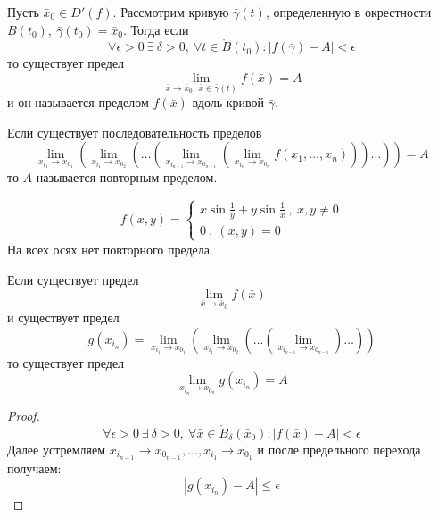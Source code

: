\begin{definition}
    Пусть $\bar{x}_0\in D'(f)$. Рассмотрим кривую $\bar{\gamma}(t)$, определенную в окрестности $B(t_0),\ \bar{\gamma}(t_0)=\bar{x}_0$. Тогда если 
    \[\forall \epsilon>0\ \exists\ \delta>0,\ \forall t\in \mathring{B}(t_0): |f(\bar{\gamma})-A|<\epsilon\]
    то существует предел 
    \[\lim\limits_{\bar{x}\to \bar{x}_0,\ \bar{x}\in \bar{\gamma}(t)}f(\bar{x})=A\]
    и он называется пределом $f(\bar{x})$ вдоль кривой $\bar{\gamma}$.
\end{definition} 
\begin{definition}
    Если существует последовательность пределов
    \[\lim\limits_{x_{i_1}\to x_{0_1}}(\lim\limits_{x_{i_1}\to x_{0_2}}(\dots(\lim\limits_{x_{i_{n-1}}\to x_{0_{n-1}}}(\lim\limits_{x_{i_n}\to x_{0_n}}f(x_1,\dots,x_n)))\dots))=A\]
    то $A$ называется повторным пределом. 
\end{definition} 
\begin{example}
    \[f(x,y)=\begin{cases}
        x\sin{\frac{1}{y}+y\sin{\frac{1}{x}}}\ ,\ x,y\ne 0\\
        0\ ,\ (x, y)=0
    \end{cases}
    \]
    На всех осях нет повторного предела.
\end{example}
\begin{theorem}
    Если существует предел
    \[\lim\limits_{\bar{x}\to \bar{x}_0}f(\bar{x})\]
    и существует предел
    \[g(x_{i_n})=\lim\limits_{x_{i_1}\to x_{0_1}}(\lim\limits_{x_{i_1}\to x_{0_2}}(\dots(\lim\limits_{x_{i_{n-1}}\to x_{0_{n-1}}})\dots))\]
    то существует предел
    \[\lim\limits_{x_{i_n}\to x_{0_n}}g(x_{i_n})=A\]
\end{theorem} 
\begin{proof}
    \[\forall \epsilon>0\ \exists\ \delta>0,\ \forall \bar{x}\in \mathring{B}_{\delta}(\bar{x}_0): |f(\bar{x})-A|<\epsilon\]
    Далее устремляем $x_{i_{n-1}}\to x_{0_{n-1}}, \dots, x_{i_1}\to x_{0_1}$ и после предельного перехода получаем:
    \[|g(x_{i_n})-A|\leq \epsilon\]
\end{proof} 
